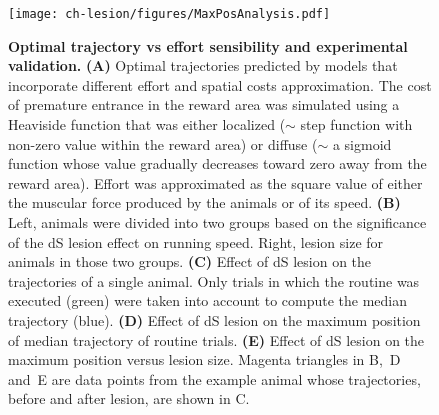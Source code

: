 \begin{figure}[bth!]
 \begin{center}
	\texttt{[image: ch-lesion/figures/MaxPosAnalysis.pdf]}
	\caption[]
	{\textbf{Optimal trajectory vs effort sensibility and experimental validation.}
	\textbf{(A)} Optimal trajectories predicted by models that incorporate different effort and spatial costs approximation.
	The cost of premature entrance in the reward area was simulated using a Heaviside function that was either localized ($\sim$ step function with non-zero value within the reward area) or diffuse ($\sim$ a sigmoid function whose value gradually decreases toward zero away from the reward area).
	Effort was approximated as the square value of either the muscular force produced by the animals or of its speed.
	\textbf{(B)} Left, animals were divided into two groups based on the significance of the dS lesion effect on running speed. Right, lesion size for animals in those two groups.
	\textbf{(C)} Effect of dS lesion on the trajectories of a single animal. Only trials in which the routine was executed (green) were taken into account to compute the median trajectory (blue).
	\textbf{(D)} Effect of dS lesion on the maximum position of median trajectory of routine trials.
	\textbf{(E)} Effect of dS lesion on the maximum position versus lesion size.
	Magenta triangles in B,~D and~E are data points from the example animal whose trajectories, before and after lesion, are shown in C.
	}
	\label{fig:lesion:maxPos}
 \end{center}
\end{figure}